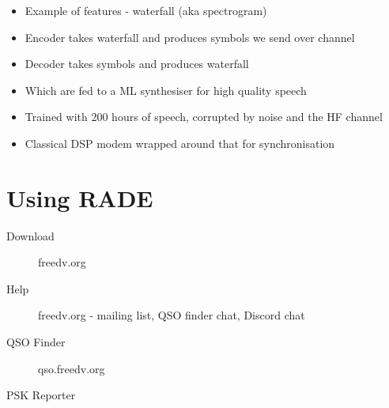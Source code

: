 \documentclass{beamer}
\begin{document}
\begin{frame}
\begin{itemize}
	\item Example of features - waterfall (aka spectrogram)
	\item Encoder takes waterfall and produces symbols we send over channel
	\item Decoder takes symbols and produces waterfall
	\item Which are fed to a ML synthesiser for high quality speech
	\item Trained with 200 hours of speech, corrupted by noise and the HF channel
	\item Classical DSP modem wrapped around that for synchronisation
\end{itemize}
\end{frame}

\section{Using RADE}

\begin{frame}
\begin{description}
    \item[Download] freedv.org 
    \item[Help] freedv.org - mailing list, QSO finder chat, Discord chat
    \item[QSO Finder] qso.freedv.org \href{http://qso.freedv.org}{}
    \item[PSK Reporter] \href{https://pskreporter.info/pskmap?preset&callsign=ZZZZZ&what=all&mode=FREEDV&timerange=86400&mapCenter=17.5,-8,2.6}{}    
\end{description}
\end{frame} 
\end{document}
